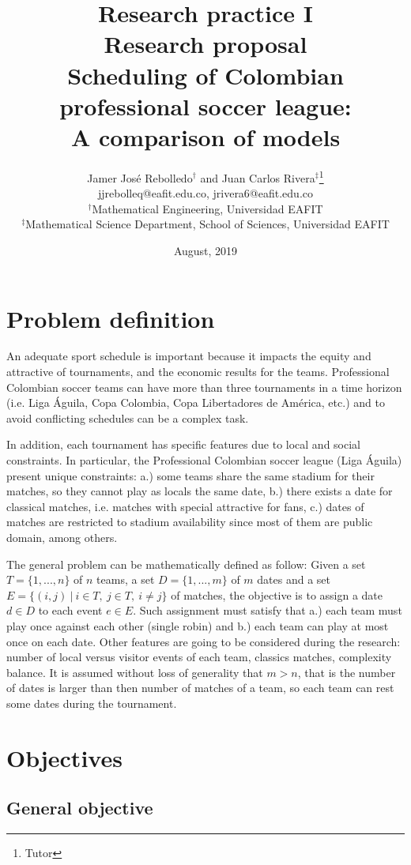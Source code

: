 \documentclass[11pt,letterpaper]{article}
\author{Jamer José Rebolledo$^\dag$ and Juan Carlos Rivera$^\ddag$\footnote{ Tutor} \\ \vspace{0.3cm}\small{jjrebolleq@eafit.edu.co, jrivera6@eafit.edu.co}\\ $^\dag$Mathematical Engineering, Universidad EAFIT\\ $^\ddag$Mathematical Science Department, School of Sciences, Universidad EAFIT}
\title{\large Research practice I\\ \vspace{0.2cm} Research proposal\\ \vspace{0.5cm} \LARGE Scheduling of Colombian professional soccer league: \\A comparison of models}
\begin{document}
\date{August, 2019}

\maketitle


\section{Problem definition}

An adequate sport schedule is important because it impacts the equity and attractive of tournaments, and the economic results for the teams. Professional Colombian soccer teams can have more than three tournaments in a time horizon (i.e. Liga Águila, Copa Colombia, Copa Libertadores de América, etc.) and to avoid conflicting schedules can be a complex task.

In addition, each tournament has specific features due to local and social constraints. In particular, the Professional Colombian soccer league (Liga Águila) present unique constraints: a.) some teams share the same stadium for their matches, so they cannot play as locals the same date, b.) there exists a date for classical matches, i.e. matches with special attractive for fans, c.) dates of matches are restricted to stadium availability since most of them are public domain, among others.

The general problem can be mathematically defined as follow: Given a set $T=\{1,...,n\}$ of $n$ teams, a set $D=\{1,...,m\}$ of $m$ dates and a set $E=\{(i,j) \ | \ i\in T, \ j \in T, \ i\neq j\}$ of matches, the objective is to assign a date $d \in D$ to each event $e \in E$. Such assignment must satisfy that a.) each team must play once against each other (single robin) and b.) each team can play at most once on each date. Other features are going to be considered during the research: number of local versus visitor events of each team, classics matches, complexity balance. It is assumed without loss of generality that $m>n$, that is the number of dates is larger than then number of matches of a team, so each team can rest some dates during the tournament.


\section{Objectives}

\subsection{General objective}
\end{document}
